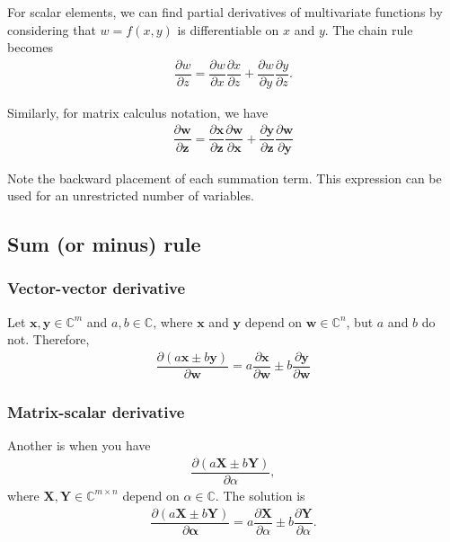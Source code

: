 \documentclass{article}
\begin{document}
For scalar elements, we can find partial derivatives of multivariate functions by considering that \(w = f(x, y)\) is differentiable on \(x\) and \(y\). The chain rule becomes
\begin{align}
    \dfrac{\partial w}{\partial z} = \dfrac{\partial w}{\partial x} \dfrac{\partial x}{\partial z} + \dfrac{\partial w}{\partial y} \dfrac{\partial y}{\partial z}.
\end{align}

Similarly, for matrix calculus notation, we have
\begin{align}
    \label{eq:chain-multi-inter}
    \dfrac{\partial \mathbf{w}}{\partial \mathbf{z}} = \dfrac{\partial \mathbf{x}}{\partial \mathbf{z}} \dfrac{\partial \mathbf{w}}{\partial \mathbf{x}} + \dfrac{\partial \mathbf{y}}{\partial \mathbf{z}} \dfrac{\partial \mathbf{w}}{\partial \mathbf{y}}
\end{align}

Note the backward placement of each summation term. This expression can be used for an unrestricted number of variables.

\subsection{Sum (or minus) rule}
\subsubsection{Vector-vector derivative}
Let \(\mathbf{x}, \mathbf{y} \in \mathbb{C}^{m}\) and \(a, b \in \mathbb{C}\), where \(\mathbf{x}\) and \(\mathbf{y}\) depend on \(\mathbf{w} \in \mathbb{C}^{n}\), but \(a\) and \(b\) do not. Therefore,
\begin{align}
    \dfrac{\partial (a\mathbf{x} \pm b\mathbf{y})}{\partial\mathbf{w}} = a\dfrac{\partial \mathbf{x}}{\partial\mathbf{w}} \pm b\dfrac{\partial \mathbf{y}}{\partial\mathbf{w}}
\end{align}
\subsubsection{Matrix-scalar derivative}
Another is when you have
\begin{align}
    \dfrac{\partial \left( a\mathbf{X} \pm b\mathbf{Y} \right)}{\partial \alpha},
\end{align}
where \(\mathbf{X}, \mathbf{Y} \in \mathbb{C}^{m \times n}\) depend on \(\alpha \in \mathbb{C}\). The solution is
\begin{align}
    \dfrac{\partial (a\mathbf{X} \pm b\mathbf{Y})}{\partial\mathbf{\alpha}} = a\dfrac{\partial \mathbf{X}}{\partial \alpha} \pm b \dfrac{\partial \mathbf{Y}}{\partial \alpha}.
\end{align}
\end{document}
